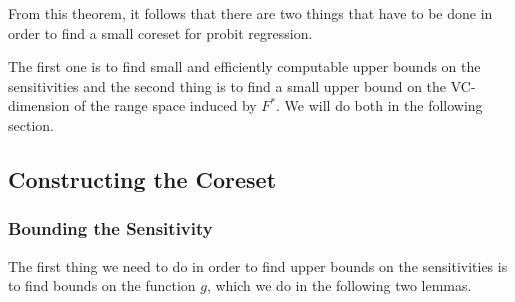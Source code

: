 From this theorem, it follows that there are two things that have to be
done in order to find a small coreset for probit regression.

The first one is to find small and efficiently computable upper bounds
on the sensitivities and the second thing is to find a
small upper bound on the VC-dimension of the range space induced by $F^\ast$.
We will do both in the following section.

\subsection{Constructing the Coreset}

\subsubsection{Bounding the Sensitivity}

The first thing we need to do in order to find upper bounds on
the sensitivities is to find bounds on the function $g$,
which we do in the following two lemmas.

